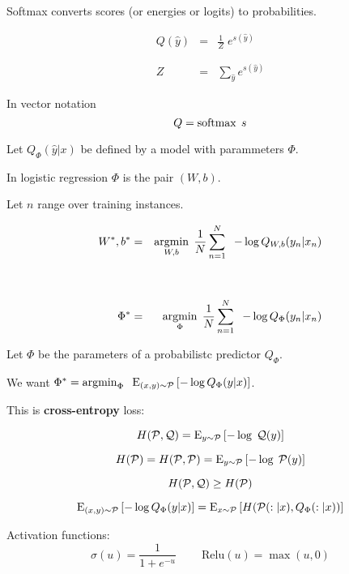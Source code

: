{

Softmax converts scores (or energies or logits) to probabilities.

\vfill
\begin{eqnarray*}
  Q(\hat{y}) & = & \frac{1}{Z}\; e^{s(\hat{y})}
  \\
  \\
  \\
  Z & = & \sum_{\hat{y}} e^{s(\hat{y})}
\end{eqnarray*}

\vfill
In vector notation
\bigskip
$$Q  = \operatorname*{softmax}\; s$$

Let $Q_\Phi(\hat{y}|x)$ be defined by a model with parammeters $\Phi$.

\vfill
In logistic regression $\Phi$ is the pair $(W,b)$.

\vfill
Let $n$ range over training instances.

\begin{eqnarray*}
  W^*, b^* & = & \operatorname*{argmin}_{W,b}\; \frac{1}{N} \sum_{n = 1}^N\;\;- \log Q_{W,b}(y_n|x_n) \\
  \\
  \\
  \Phi^* & = & \operatorname*{argmin}_\Phi \;\frac{1}{N} \sum_{n = 1}^N\;\;- \log Q_\Phi(y_n|x_n) \\
\end{eqnarray*}



Let $\Phi$ be the parameters of a probabilistc predictor $Q_\Phi$.

\vfill
\vfill
\centerline{We want \hspace{3ex} $\Phi^* = \operatorname*{argmin}_\Phi \;\;\mathrm{E}_{(x,y) \sim {\cal P}}\left[ -\log Q_\Phi(y|x)\right]$.}

\vfill
\vfill
\vfill
This is {\bf cross-entropy} loss:

$$H({\cal P},{\cal Q}) = \mathrm{E}_{y \sim {\cal P}}\left[-\log\; {\cal Q}(y)\right]$$

$$H({\cal P}) = H({\cal P},{\cal P}) = \mathrm{E}_{y \sim {\cal P}}\left[-\log\; {\cal P}(y)\right]$$

$$H({\cal P},{\cal Q}) \geq H({\cal P})$$

$$\mathrm{E}_{(x,y) \sim {\cal P}}\left[ -\log Q_\Phi(y|x)\right] = \mathrm{E}_{x \sim {\cal P}}\left[H({\cal P}(:|x),Q_\Phi(:|x))\right]$$


Activation functions:
$$\sigma(u) = \frac{1}{1+e^{-u}}\;\;\;\;\;\;\;\;\mathrm{Relu}(u) = \max(u,0)$$

}
